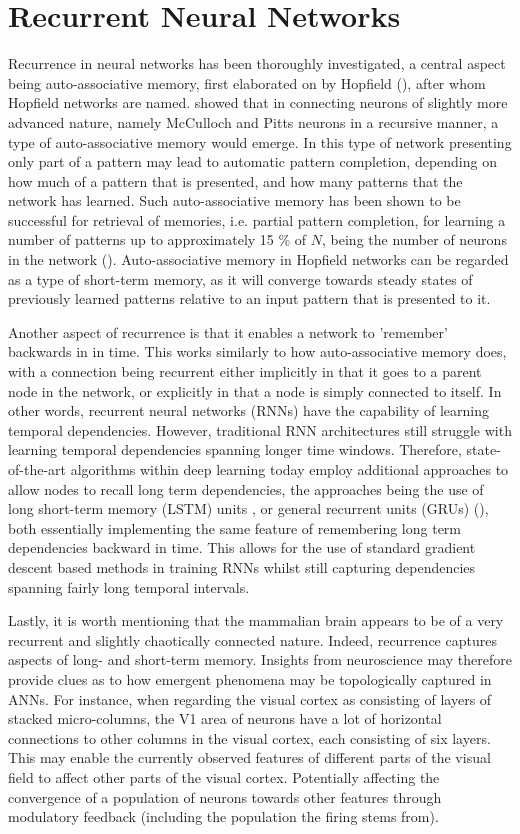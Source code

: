 \section{Recurrent Neural Networks}

Recurrence in neural networks has been thoroughly investigated, a central aspect being auto-associative memory, first elaborated on by Hopfield (\cite{Hopfield1982}), after whom Hopfield networks are named. \cite{Hopfield1982} showed that in connecting neurons of slightly more advanced nature, namely McCulloch and Pitts neurons in a recursive manner, a type of auto-associative memory would emerge. In this type of network presenting only part of a pattern may lead to automatic pattern completion, depending on how much of a pattern that is presented, and how many patterns that the network has learned. Such auto-associative memory has been shown to be successful for retrieval of memories, i.e. partial pattern completion, for learning a number of patterns up to approximately 15 \% of $N$, being the number of neurons in the network (\cite{Hopfield1982}). Auto-associative memory in Hopfield networks can be regarded as a type of short-term memory, as it will converge towards steady states of previously learned patterns relative to an input pattern that is presented to it.

Another aspect of recurrence is that it enables a network to 'remember' backwards in in time. This works similarly to how auto-associative memory does, with a connection being recurrent either implicitly in that it goes to a parent node in the network, or explicitly in that a node is simply connected to itself. In other words, recurrent neural networks (RNNs) have the capability of learning temporal dependencies. However, traditional RNN architectures still struggle with learning temporal dependencies spanning longer time windows. Therefore, state-of-the-art algorithms within deep learning today employ additional approaches to allow nodes to recall long term dependencies, the approaches being the use of long short-term memory (LSTM) units \cite{Hochreiter1997}, or general recurrent units (GRUs) (\cite{Cho2014}), both essentially implementing the same feature of remembering long term dependencies backward in time. This allows for the use of standard gradient descent based methods in training RNNs whilst still capturing dependencies spanning fairly long temporal intervals.

Lastly, it is worth mentioning that the mammalian brain appears to be of a very recurrent and slightly chaotically connected nature. Indeed, recurrence captures aspects of long- and short-term memory. Insights from neuroscience may therefore provide clues as to how emergent phenomena may be topologically captured in ANNs.
For instance, when regarding the visual cortex as consisting of layers of stacked micro-columns, the V1 area of neurons have a lot of horizontal connections to other columns in the visual cortex, each consisting of six layers. This may enable the currently observed features of different parts of the visual field to affect other parts of the visual cortex. Potentially affecting the convergence of a population of neurons towards other features through modulatory feedback (including the population the firing stems from).


